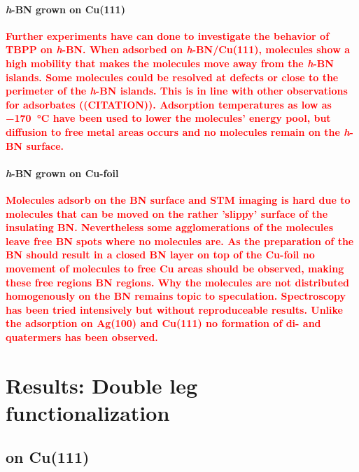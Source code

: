 	\paragraph{\textit{h}-BN grown on Cu(111)}
	\textcolor{red}{\textbf{
			Further experiments have can done to investigate the behavior of TBPP on \textit{h}-BN. When adsorbed on \textit{h}-BN/Cu(111), molecules show a high mobility that makes the molecules move away from the \textit{h}-BN islands. Some molecules could be resolved at defects or close to the perimeter of the \textit{h}-BN islands. This is in line with other observations for adsorbates ((CITATION)). Adsorption temperatures as low as \SI{-170}{\celsius} have been used to lower the molecules' energy pool, but diffusion to free metal areas occurs and no molecules remain on the \textit{h}-BN surface.
		}}
		
		\paragraph{\textit{h}-BN grown on Cu-foil}
		\textcolor{red}{\textbf{
				Molecules adsorb on the BN surface and STM imaging is hard due to molecules that can be moved on the rather 'slippy' surface of the insulating BN. Nevertheless some agglomerations of the molecules leave free BN spots where no molecules are. As the preparation of the BN should result in a closed BN layer on top of the Cu-foil no movement of molecules to free Cu areas should be observed, making these free regions BN regions.
				Why the molecules are not distributed homogenously on the BN remains topic to speculation.
				Spectroscopy has been tried intensively but without reproduceable results.
				Unlike the adsorption on Ag(100) and Cu(111) no formation of di- and quatermers has been observed.
			}}

\section{Results: Double leg functionalization}
	\subsection{on Cu(111)}
	
